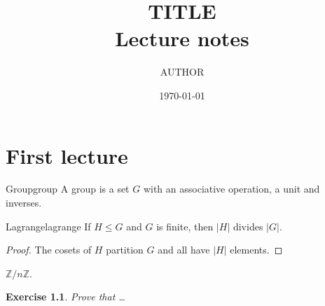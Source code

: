 \documentclass[11pt]{report}
\title{{{TITLE}}\\[4pt]\large Lecture notes}
\author{{{AUTHOR}}}
\date{\today}
\newtheorem*{exercise}{Exercise}
\begin{document}
\maketitle
\tableofcontents
\chapter{First lecture}
\begin{definition}{Group}{group}
A group is a set $G$ with an associative operation, a unit and inverses.
\end{definition}
\begin{theorem}{Lagrange}{lagrange}
If $H\le G$ and $G$ is finite, then $|H|$ divides $|G|$.
\end{theorem}
\begin{proof}
The cosets of $H$ partition $G$ and all have $|H|$ elements.
\end{proof}
\begin{example}{}{}
$\mathbb Z/n\mathbb Z$.
\end{example}
\begin{exercise}
Prove that \dots
\end{exercise}
\end{document}
